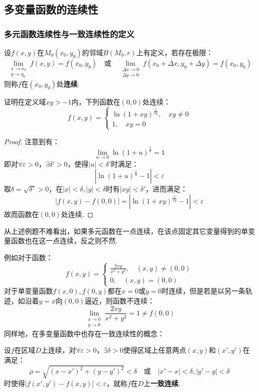 \subsection{多变量函数的连续性}
\subsubsection{多元函数连续性与一致连续性的定义}
\begin{definition}
    设$f(x,y)$在$M_0(x_0,y_0)$的邻域$B(M_0,r)$上有定义，若存在极限：
    \[\lim_{\substack{x \to x_0 \\ y \to y_0}}f(x,y) = f(x_0,y_0) \quad\text{或}\quad \lim_{\substack{\Delta x \to 0 \\ \Delta y \to 0}}f(x_0+\Delta x, y_0+\Delta y) = f(x_0,y_0)\]
    则称$f$在$(x_0,y_0)$处\textbf{连续}.
\end{definition}

\begin{question}
    证明在定义域$xy>-1$内，下列函数在$(0,0)$处连续：
    \[f(x,y) = \begin{cases}
        \ln(1+xy)^{\frac{1}{xy}},\quad xy \neq 0\\
        1,\quad xy = 0
    \end{cases}\]
\end{question}

\begin{proof}
    注意到有：
    \[\lim\limits_{u \to 0}\ln(1+u)^{\frac{1}{u}} = 1\]
    即对$\forall \varepsilon > 0$，$\exists \delta'>0$，使得$|u| < \delta'$时满足：
    \[\left|\ln(1+u)^{\frac{1}{u}} - 1\right| < \varepsilon\]
    取$\delta = \sqrt{\delta'} > 0$，在$|x|<\delta,|y|<\delta$时有$|xy|<\delta'$，进而满足：
    \[|f(x,y)-f(0,0)| = \left|\ln(1+xy)^{\frac{1}{xy}} - 1\right| < \varepsilon\]
    故而函数在$(0,0)$处连续.
\end{proof}

从上述例题不难看出，如果多元函数在一点连续，在该点固定其它变量得到的单变量函数也在这一点连续，反之则不然.

例如对于函数：
\[f(x,y) = \begin{cases}
    \displaystyle \frac{2xy}{x^2+y^2},\quad (x,y) \neq (0,0)\\
    0,\quad (x,y) = (0,0)
\end{cases}\]
对于单变量函数$f(x,0),f(0,y)$都在$x=0$或$y=0$时连续，但是若是以另一条轨迹，如沿着$y=x$向$(0,0)$逼近，则函数不连续：
\[\lim_{\substack{x \to 0 \\ y \to 0}}\frac{2xy}{x^2+y^2} = 1 \neq f(0,0)\]
同样地，在多变量函数中也存在一致连续性的概念：
\begin{definition}
    设$f$在区域$D$上连续，对$\forall \varepsilon > 0$，$\exists \delta>0$使得区域上任意两点$(x,y)$和$(x',y')$在满足：
    \[\rho = \sqrt{(x-x')^2 + (y-y')^2} < \delta \quad\text{或}\quad |x'-x|<\delta,|y'-y|<\delta\]
    时使得$|f(x',y')-f(x,y)|<\varepsilon$，就称$f$在$D$上\textbf{一致连续}.
\end{definition}


